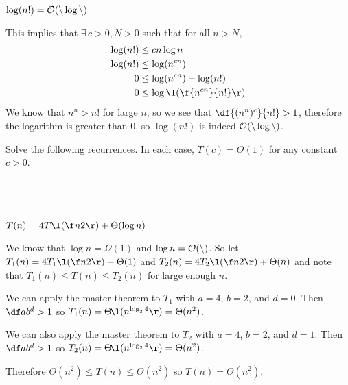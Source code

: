 \documentclass[a4paper]{article}
\begin{document}
\subsection{~} %

\begin{questionbody}
$\log (n!) = \cal O(n \log n)$
\end{questionbody}

This implies that $\exists\, c > 0, N > 0$ such that for all $n > N$, \begin{align*}
\log (n!) &\le c n \log n\\
\log (n!) &\le \log(n^{cn})\\
0 &\le \log(n^{cn}) - \log(n!)\\
0 &\le \log\l(\f{n^{cn}}{n!}\r)
\end{align*}
We know that $n^n > n!$ for large $n$, so we see that $\df{(n^n)^c}{n!} > 1$, therefore the logarithm is greater than $0$, so $\log(n!)$ is indeed $\cal O(n \log n)$.


\begin{questionbody}
Solve the following recurrences. In each case, $T(c) = \Theta(1)$ for any constant $c > 0$.
\end{questionbody}

\subsection{~} %

\begin{questionbody}
$T(n) = 4T\l(\f n2\r) + \Theta(\log n)$
\end{questionbody}

We know that $\log n = \Omega(1)$ and $\log n = \cal O(n)$. So let $T_1(n) = 4T_1\l(\f n2\r) + \Theta(1)$ and $T_2(n) = 4T_2\l(\f n2\r) + \Theta(n)$ and note that $T_1(n) \le T(n) \le T_2(n)$ for large enough $n$.

We can apply the master theorem to $T_1$ with $a=4$, $b=2$, and $d=0$. Then $\df a{b^d} > 1$ so $T_1(n) = \Theta\!\l(n^{\log_2 4}\r) = \Theta(n^2)$.

We can also apply the master theorem to $T_2$ with $a=4$, $b=2$, and $d=1$. Then $\df a{b^d} > 1$ so $T_2(n) = \Theta\!\l(n^{\log_2 4}\r) = \Theta(n^2)$.

Therefore $\Theta(n^2) \le T(n) \le \Theta(n^2)$ so $T(n) = \Theta(n^2)$.

\subsection{~} %
\end{document}
